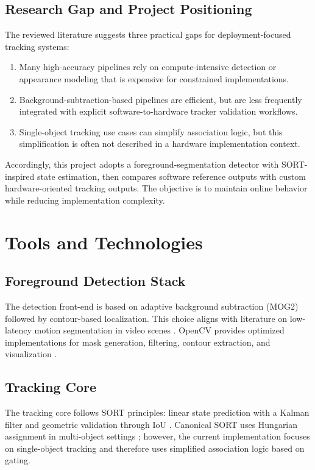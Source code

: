 \subsection{Research Gap and Project Positioning}
The reviewed literature suggests three practical gaps for deployment-focused tracking systems:
\begin{enumerate}
	\item Many high-accuracy pipelines rely on compute-intensive detection or appearance modeling 
	that is expensive for constrained implementations.
	\item Background-subtraction-based pipelines are efficient, but are less frequently integrated 
	with explicit software-to-hardware tracker validation workflows.
	\item Single-object tracking use cases can simplify association logic, but this simplification 
	is often not described in a hardware implementation context.
\end{enumerate}

Accordingly, this project adopts a foreground-segmentation detector with SORT-inspired state estimation, 
then compares software reference outputs with custom hardware-oriented tracking outputs. The objective 
is to maintain online behavior while reducing implementation complexity.

\section{Tools and Technologies}
\label{section:tools_tech}

\subsection{Foreground Detection Stack}
The detection front-end is based on adaptive background subtraction (MOG2) followed by contour-based 
localization. This choice aligns with literature on low-latency motion segmentation in video scenes 
\cite{StaufferGrimson1999, Zivkovic2004, ZivkovicHeijden2006}. OpenCV provides optimized implementations 
for mask generation, filtering, contour extraction, and visualization \cite{Bradski2000OpenCV}.

\subsection{Tracking Core}
The tracking core follows SORT principles: linear state prediction with a Kalman filter and 
geometric validation through IoU \cite{Kalman1960, Bewley2016_sort}. Canonical SORT uses Hungarian 
assignment in multi-object settings \cite{Kuhn1955Hungarian}; however, the current implementation 
focuses on single-object tracking and therefore uses simplified association logic based on gating.

